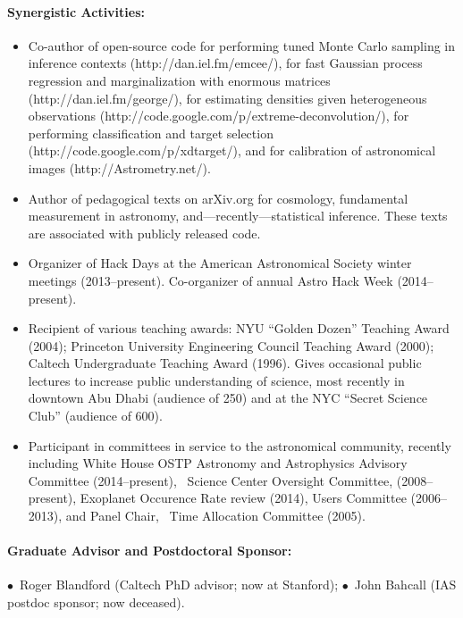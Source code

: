 \documentclass[letterpaper,12pt]{article}
\begin{document}
\paragraph{Synergistic Activities:}
\begin{itemize}\setlength{\itemsep}{0pt}
\item
Co-author of open-source code
for performing tuned Monte Carlo sampling in inference contexts (http://dan.iel.fm/emcee/),
for fast Gaussian process regression and marginalization with enormous matrices (http://dan.iel.fm/george/),
for estimating densities given heterogeneous observations (http://code.google.com/p/extreme-deconvolution/),
for performing classification and target selection (http://code.google.com/p/xdtarget/),
and
for calibration of astronomical images (http://Astrometry.net/).
\item
Author of pedagogical texts on arXiv.org for cosmology, fundamental
measurement in astronomy, and---recently---statistical inference.
These texts are associated with publicly released code.
\item
Organizer of Hack Days at the American Astronomical Society winter meetings (2013--present).
Co-organizer of annual Astro Hack Week (2014--present).
\item
Recipient of various teaching awards: 
NYU ``Golden Dozen'' Teaching Award (2004);
Princeton University Engineering Council Teaching Award (2000);
Caltech Undergraduate Teaching Award (1996).
Gives occasional public lectures to increase public understanding of
science, most recently in downtown Abu Dhabi (audience of 250) and at
the NYC ``Secret Science Club'' (audience of 600).
\item
Participant in committees in service to the astronomical community,
recently including
White House OSTP Astronomy and Astrophysics Advisory Committee (2014--present),
\Spitzer\ Science Center Oversight Committee, (2008--present),
 Exoplanet Occurence Rate review (2014),
 Users Committee (2006--2013),
and
Panel Chair, \Spitzer\ Time Allocation Committee (2005).
\end{itemize}

\paragraph{Graduate Advisor and Postdoctoral Sponsor:}
$\bullet$~Roger Blandford (Caltech PhD advisor; now at Stanford);
$\bullet$~John Bahcall (IAS postdoc sponsor; now deceased).
\end{document}

